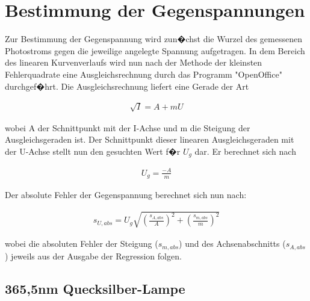 \documentclass[a4paper, 10pt]{report}%
\begin{document}
\section{Bestimmung der Gegenspannungen}

Zur Bestimmung der Gegenspannung wird zun�chst die Wurzel des gemessenen Photostroms gegen die jeweilige angelegte Spannung aufgetragen. In dem Bereich des linearen Kurvenverlaufs wird nun nach der Methode der kleinsten Fehlerquadrate eine Ausgleichsrechnung durch das Programm "OpenOffice" durchgef�hrt. Die Ausgleichsrechnung liefert eine Gerade der Art

\begin{eqnarray}
\sqrt{I} = A + mU
\end{eqnarray}

wobei A der Schnittpunkt mit der I-Achse und m die Steigung der Ausgleichsgeraden ist. Der Schnittpunkt dieser linearen Ausgleichsgeraden mit der U-Achse stellt nun den gesuchten Wert f�r $U_g$ dar. Er berechnet sich nach

\begin{eqnarray}
U_g = \frac{-A}{m}
\end{eqnarray}

Der absolute Fehler der Gegenspannung berechnet sich nun nach:

\begin{eqnarray}
s_{U,abs} = U_g \sqrt{\left(\frac{s_{A,abs}}{A}\right)^2 + \left(\frac{s_{m,abs}}{m}\right)^2}
\end{eqnarray}

wobei die absoluten Fehler der Steigung ($s_{m,abs}$) und des Achsenabschnitts ($s_{A,abs}$) jeweils aus der Ausgabe der Regression folgen. 
\newpage
\subsection{365,5nm Quecksilber-Lampe}
\end{document}
